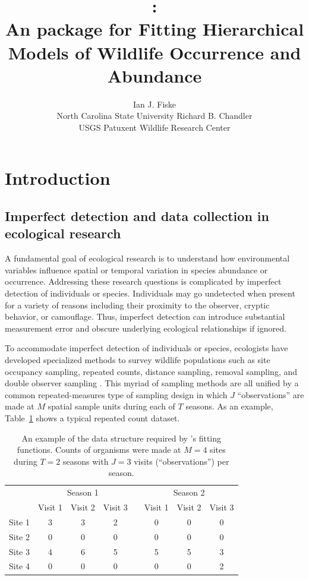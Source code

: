 \documentclass[article,shortnames]{jss}
\author{Ian J. Fiske\\North Carolina State University \And
  Richard B. Chandler\\ USGS Patuxent Wildlife Research Center}
\title{\pkg{unmarked}:\\
  An \proglang{R} package for Fitting Hierarchical Models of
  Wildlife Occurrence and Abundance}
\newcommand{\um}{\pkg{unmarked}}
\begin{document}
\section{Introduction}


\subsection{Imperfect detection and data collection in ecological research}

A fundamental goal of ecological research is to understand how environmental
variables influence spatial or temporal variation in species abundance or
occurrence.  Addressing these research questions is complicated by imperfect
detection of individuals or species.  Individuals may go
undetected when present for a variety of reasons including their proximity to
the observer, cryptic behavior, or camouflage. Thus, imperfect detection
can introduce substantial measurement error and obscure underlying
ecological relationships if ignored.

To accommodate imperfect detection of individuals or species,
ecologists have developed specialized methods to survey wildlife
populations such as site occupancy sampling, repeated counts,
distance sampling, removal sampling, and double observer sampling
\citetext{see Section~\ref{sec:models-impl-unmark} and
\citet{WilliamsEA2002} for definitions}.  This myriad of sampling methods
are all unified by a common repeated-measures type of sampling design in
which $J$ ``observations'' are made at $M$ spatial sample units during each of
$T$ seasons. As an example, Table~\ref{tab:exdata} shows a typical
repeated count dataset.

\begin{table}[h]
\begin{centering}
\begin{tabular}{lccccccc}
\hline
& \multicolumn{3}{c}{Season 1} && \multicolumn{3}{c}{Season 2} \\
\cline{2-4} \cline{6-8}
        & Visit 1 & Visit 2 & Visit 3 && Visit 1 & Visit 2 & Visit 3 \\
\hline
Site 1  & 3       & 3       & 2       && 0       & 0       & 0 \\
Site 2  & 0       & 0       & 0       && 0       & 0       & 0 \\
Site 3  & 4       & 6       & 5       && 5       & 5       & 3 \\
Site 4  & 0       & 0       & 0       && 0       & 0       & 2 \\
\hline
\end{tabular}
\caption{An example of the data structure required by \um's fitting functions.
Counts of organisms were made at $M=4$ sites during $T=2$ seasons with $J=3$
visits (``observations'') per season.}
\end{centering}
\label{tab:exdata}
\end{table}
\end{document}

